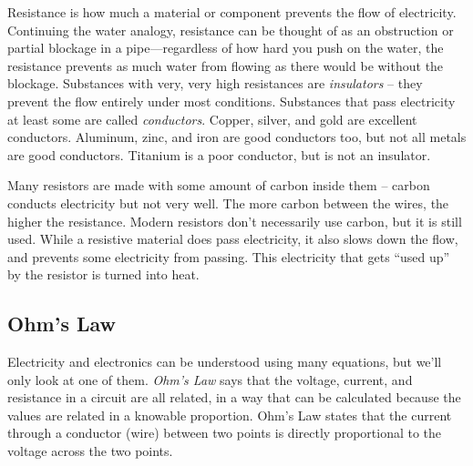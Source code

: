 Resistance is how much a material or component prevents the flow of electricity. Continuing the water analogy, resistance can be thought of as an obstruction or partial blockage in a pipe---regardless of how hard you push on the water, the resistance prevents as much water from flowing as there would be without the blockage. Substances with very, very high resistances are \emph{insulators} -- they prevent the flow entirely under most conditions. Substances that pass electricity at least some are called \emph{conductors}. Copper, silver, and gold are excellent conductors. Aluminum, zinc, and iron are good conductors too, but not all metals are good conductors. Titanium is a poor conductor, but is not an insulator.

Many resistors are made with some amount of carbon inside them -- carbon conducts electricity but not very well. The more carbon between the wires, the higher the resistance. Modern resistors don't necessarily use carbon, but it is still used. While a resistive material does pass electricity, it also slows down the flow, and prevents some electricity from passing. This electricity that gets ``used up'' by the resistor is turned into heat.


\subsection*{Ohm's Law}

Electricity and electronics can be understood using many equations, but we'll only look at one of them. \emph{Ohm's Law} says that the voltage, current, and resistance in a circuit are all related, in a way that can be calculated because the values are related in a knowable proportion. Ohm's Law states that the current through a conductor (wire) between two points is directly proportional to the voltage across the two points.

